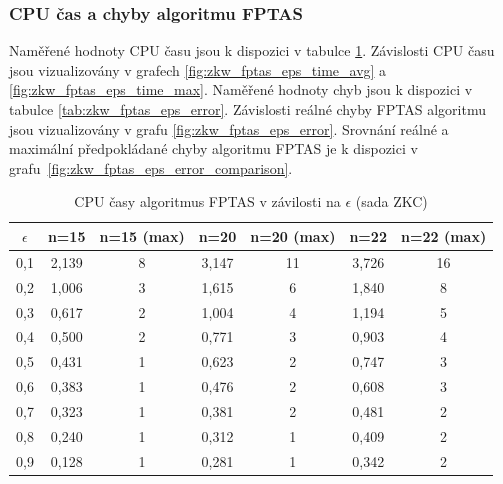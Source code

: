 \documentclass[12pt]{article}
\begin{document}
\subsubsection{CPU čas a chyby algoritmu FPTAS}

Naměřené hodnoty CPU času jsou k dispozici v tabulce \ref{tab:zkw_fptas_eps_times}. Závislosti CPU času jsou vizualizovány v grafech \ref{fig:zkw_fptas_eps_time_avg} a \ref{fig:zkw_fptas_eps_time_max}.
Naměřené hodnoty chyb jsou k dispozici v tabulce \ref{tab:zkw_fptas_eps_error}. Závislosti reálné chyby FPTAS algoritmu jsou vizualizovány v grafu \ref{fig:zkw_fptas_eps_error}. Srovnání reálné a maximální předpokládané chyby algoritmu FPTAS je k dispozici v grafu~\ref{fig:zkw_fptas_eps_error_comparison}.

\begin{table}
    \begin{center}
         \begin{tabular}{|c | c | c | c | c | c | c|} 
         \hline
         $\epsilon$ & n=15 & n=15 (max) & n=20 & n=20 (max) & n=22 & n=22 (max) \\ [0.1ex] 
         \hline\hline
        0,1 & 2,139 & 8 & 3,147 & 11 & 3,726 & 16 \\
        \hline
        0,2 & 1,006 & 3 & 1,615 & 6 & 1,840 & 8 \\
        \hline
        0,3 & 0,617 & 2 & 1,004 & 4 & 1,194 & 5 \\
        \hline
        0,4 & 0,500 & 2 & 0,771 & 3 & 0,903 & 4 \\
        \hline
        0,5 & 0,431 & 1 & 0,623 & 2 & 0,747 & 3 \\
        \hline
        0,6 & 0,383 & 1 & 0,476 & 2 & 0,608 & 3 \\
        \hline
        0,7 & 0,323 & 1 & 0,381 & 2 & 0,481 & 2 \\
        \hline
        0,8 & 0,240 & 1 & 0,312 & 1 & 0,409 & 2 \\
        \hline
        0,9 & 0,128 & 1 & 0,281 & 1 & 0,342 & 2 \\
        \hline
        \end{tabular}
        \caption{CPU časy algoritmus FPTAS v závilosti na $\epsilon$ (sada ZKC)} \label{tab:zkw_fptas_eps_times}
    \end{center}
\end{table}
\end{document}
